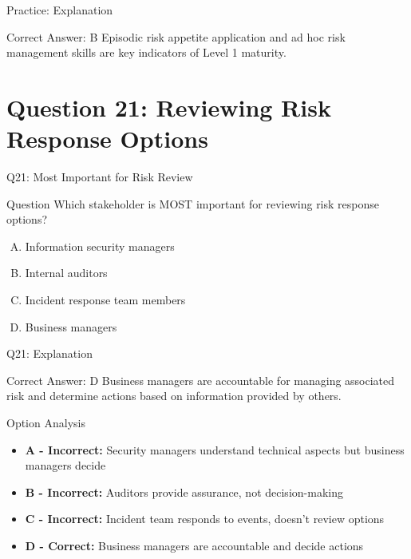 \documentclass{beamer}
\begin{document}
	\begin{frame}{Practice: Explanation}
		\begin{block}{Correct Answer: B}
			Episodic risk appetite application and ad hoc risk management skills are key indicators of Level 1 maturity.
		\end{block}
	\end{frame}
	
	\section{Question 21: Reviewing Risk Response Options}
	
	\begin{frame}{Q21: Most Important for Risk Review}
		\begin{block}{Question}
			Which stakeholder is MOST important for reviewing risk response options?
		\end{block}
		\begin{enumerate}[(A)]
			\item Information security managers
			\item Internal auditors
			\item Incident response team members
			\item Business managers
		\end{enumerate}
	\end{frame}
	
	\begin{frame}{Q21: Explanation}
		\begin{block}{Correct Answer: D}
			Business managers are accountable for managing associated risk and determine actions based on information provided by others.
		\end{block}
		\begin{block}{Option Analysis}
			\begin{itemize}
				\item \textbf{A - Incorrect:} Security managers understand technical aspects but business managers decide
				\item \textbf{B - Incorrect:} Auditors provide assurance, not decision-making
				\item \textbf{C - Incorrect:} Incident team responds to events, doesn't review options
				\item \textbf{D - Correct:} Business managers are accountable and decide actions
			\end{itemize}
		\end{block}
	\end{frame}
	
\end{document}
